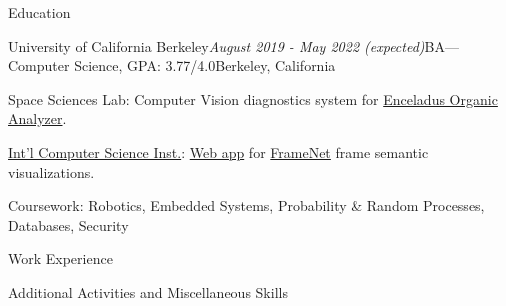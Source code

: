 \documentclass{resume} %
\begin{document}

\begin{rSection}{Education}
\begin{rSubsection}{University of California Berkeley}{\em August 2019 - May 2022 (expected)}{BA---Computer Science, GPA: 3.77/4.0}{Berkeley, California}
\item Space Sciences Lab: Computer Vision diagnostics system for \href{https://eoa.ssl.berkeley.edu/}{Enceladus Organic Analyzer}.
\item \href{https://www.icsi.berkeley.edu/icsi/}{Int'l Computer Science Inst.}: \href{https://github.com/citronella3alain/view-sesame}{Web app} for \href{https://www.icsi.berkeley.edu/icsi/}{FrameNet} frame semantic visualizations.
\item Coursework: Robotics, Embedded Systems, Probability \& Random Processes, Databases, Security
\end{rSubsection}
\end{rSection}
\begin{rSection}{Work Experience}




%
%
\end{rSection}
\begin{rSection}{Additional Activities and Miscellaneous Skills}

\end{rSection}
\end{document}
